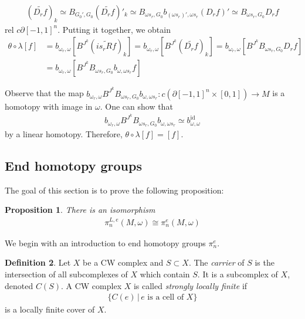 \documentclass[a4paper,11pt]{article}
\theoremstyle{definition}
\newtheorem{definition}{Definition}[section]
\theoremstyle{plain}
\newtheorem{prop}[definition]{Proposition}
\theoremstyle{remark}
\DeclareMathOperator{\id}{id}
\begin{document}
{\begin{align*}
(\widetilde{D_{r}f})_{k} \simeq B_{G_{0}',G_{0}} (\widetilde{D_{r}f})'_{k}\simeq B_{\omega s_{r},G_{0}}b_{(\omega s_{r})',\omega s_{r}} (D_{r}f)'  \simeq B_{\omega s_{r},G_{0}} D_{r}f
\end{align*} 
rel $c\partial[-1,1]^n$. Putting it together, we obtain
\begin{align*}
\theta\circ\lambda[f] &=b_{\omega_{r},\omega}[B^{J^{k}}(\widetilde{is_{r}Rf})_{k}]= b_{\omega_{r},\omega}[B^{J^{k}}(\widetilde{D_{r}f})_{k}]=b_{\omega_{r},\omega}[B^{J^{k}}B_{\omega s_{r},G_{0}} D_{r}f] \\
&= b_{\omega_{r},\omega}[B^{J^{k}}B_{\omega s_{r},G_{0}} b_{\omega,\omega s_{r}}f] 
\end{align*}

Observe that the map $b_{\omega_{r},\omega}B^{J^{k}}B_{\omega s_{r},G_{0}} b_{\omega,\omega s_{r}}: c(\partial[-1,1]^n  \times [0,1])\rightarrow M$ is a homotopy with image in $\omega$. One can show that 
\begin{align*}
b_{\omega_{r},\omega}B^{J^{k}}B_{\omega s_{r},G_{0}} b_{\omega,\omega s_{r}} \simeq b^{\id}_{\omega,\omega}
\end{align*}
by a linear homotopy. Therefore, $\theta\circ\lambda[f] =[f]$. 

\subsection{End homotopy groups}

The goal of this section is to prove the following proposition:
\begin{prop} There is an isomorphism \label{natiso}
\begin{align*}
\pi_{n}^{L,e}(M,\omega) \cong \pi_{n}^{e}(M,\omega)
\end{align*} 
\end{prop}

We begin with an introduction to end homotopy groups $\pi^e_{n}$. 

\begin{definition}
Let $X$ be a CW complex and $S\subset X$. The \textit{carrier} of $S$ is the intersection of all subcomplexes of $X$ which contain $S$. It is a subcomplex of $X$, denoted $C(S)$. A CW complex $X$ is called \textit{strongly locally finite} if 
\begin{align*}
\{C(e)\,|\, e \text{ is a cell of } X\}
\end{align*}
 is a locally finite cover of $X$. 
\end{definition}

}
\end{document}
